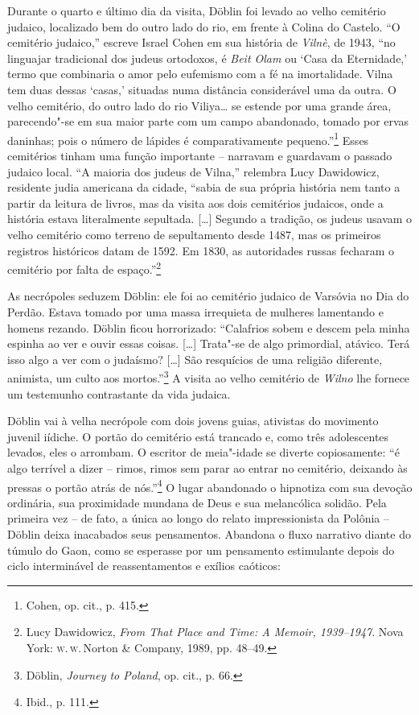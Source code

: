 Durante o quarto e último dia da visita, Döblin foi levado ao velho
cemitério judaico, localizado bem do outro lado do rio, em frente à
Colina do Castelo. ``O cemitério judaico,'' escreve Israel Cohen em sua
história de \textit{Vilnè}, de 1943, ``no linguajar tradicional dos judeus
ortodoxos, é \textit{Beit Olam} ou `Casa da Eternidade,' termo que
combinaria o amor pelo eufemismo com a fé na imortalidade. Vilna tem
duas dessas `casas,' situadas numa distância considerável uma da outra.
O velho cemitério, do outro lado do rio Viliya\ldots{} se estende por uma
grande área, parecendo"-se em sua maior parte com um campo abandonado,
tomado por ervas daninhas; pois o número de lápides é comparativamente
pequeno.''\footnote{Cohen, op. cit., p. 415.} Esses cemitérios tinham
uma função importante -- narravam e guardavam o passado judaico local.
``A maioria dos judeus de Vilna,'' relembra Lucy Dawidowicz, residente
judia americana da cidade, ``sabia de sua própria história nem tanto a
partir da leitura de livros, mas da visita aos dois cemitérios judaicos,
onde a história estava literalmente sepultada. [\ldots{}] Segundo a
tradição, os judeus usavam o velho cemitério como terreno de
sepultamento desde 1487, mas os primeiros registros históricos datam de
1592. Em 1830, as autoridades russas fecharam o cemitério por falta de
espaço.''\footnote{Lucy Dawidowicz, \textit{From That Place and Time: A Memoir, 1939--1947}. Nova York: \textsc{w.\,w.}\,Norton \& Company, 1989, pp. 48--49.}

As necrópoles seduzem Döblin: ele foi ao cemitério judaico de Varsóvia
no Dia do Perdão. Estava tomado por uma massa irrequieta de mulheres
lamentando e homens rezando. Döblin ficou horrorizado: ``Calafrios sobem
e descem pela minha espinha ao ver e ouvir essas coisas. [\ldots{}]
Trata"-se de algo primordial, atávico. Terá isso algo a ver com o
judaísmo? [\ldots{}] São resquícios de uma religião diferente, animista,
um culto aos mortos.''\footnote{Döblin, \textit{Journey to Poland}, op. cit., p. 66.} A visita ao velho cemitério de \textit{Wilno} lhe fornece um testemunho contrastante da vida judaica.

Döblin vai à velha necrópole com dois jovens guias, ativistas do
movimento juvenil iídiche. O portão do cemitério está trancado e, como
três adolescentes levados, eles o arrombam. O escritor de meia"-idade se
diverte copiosamente: ``é algo terrível a dizer -- rimos, rimos sem parar
ao entrar no cemitério, deixando às pressas o portão atrás de
nós.''\footnote{Ibid., p. 111.} O lugar abandonado o hipnotiza com sua
devoção ordinária, sua proximidade mundana de Deus e sua melancólica
solidão. Pela primeira vez -- de fato, a única ao longo do relato
impressionista da Polônia -- Döblin deixa inacabados seus pensamentos.
Abandona o fluxo narrativo diante do túmulo do Gaon, como se esperasse
por um pensamento estimulante depois do ciclo interminável de
reassentamentos e exílios caóticos:

